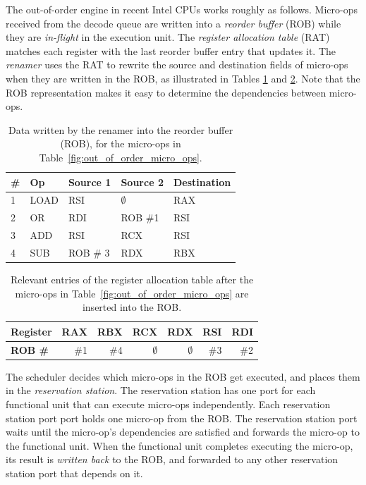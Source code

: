 
The out-of-order engine in recent Intel CPUs works roughly as follows.
Micro-ops received from the decode queue are written into a \textit{reorder
buffer} (ROB) while they are \textit{in-flight} in the execution unit. The
\textit{register allocation table} (RAT) matches each register with the last
reorder buffer entry that updates it. The \textit{renamer} uses the RAT to
rewrite the source and destination fields of micro-ops when they are written in
the ROB, as illustrated in Tables \ref{fig:out_of_order_rob} and
\ref{fig:out_of_order_rat}. Note that the ROB representation makes it easy to
determine the dependencies between micro-ops.

\begin{table}[hbt]
  \centering
  \begin{tabular}{| l | l | l | l | l |}
  \hline
  \textbf{\#} & \textbf{Op} & \textbf{Source 1} & \textbf{Source 2} &
  \textbf{Destination}\\
  \hline
  1 & LOAD & RSI & $\emptyset$ & RAX \\
  \hline
  2 & OR & RDI & ROB \#1 & RSI \\
  \hline
  3 & ADD & RSI & RCX & RSI \\
  \hline
  4 & SUB & ROB \# 3 & RDX & RBX \\
  \hline
  \end{tabular}
  \caption{
    Data written by the renamer into the reorder buffer (ROB), for the
    micro-ops in Table~\ref{fig:out_of_order_micro_ops}.
  }
  \label{fig:out_of_order_rob}
\end{table}

\begin{table}[hbt]
  \centering
  \begin{tabular}{| l | r | r | r | r | r | r |}
  \hline
  \textbf{Register} & RAX & RBX & RCX & RDX & RSI & RDI \\
  \hline
  \textbf{ROB \#} & \#1 & \#4 & $\emptyset$ & $\emptyset$ & \#3 & \#2 \\
  \hline
  \end{tabular}
  \caption{
    Relevant entries of the register allocation table after the micro-ops in
    Table~\ref{fig:out_of_order_micro_ops} are inserted into the ROB.
  }
  \label{fig:out_of_order_rat}
\end{table}


The scheduler decides which micro-ops in the ROB get executed, and places them
in the \textit{reservation station}. The reservation station has one port
for each functional unit that can execute micro-ops independently. Each
reservation station port port holds one micro-op from the ROB. The reservation
station port waits until the micro-op's dependencies are satisfied and forwards
the micro-op to the functional unit. When the functional unit completes
executing the micro-op, its result is \textit{written back} to the ROB, and
forwarded to any other reservation station port that depends on it.

